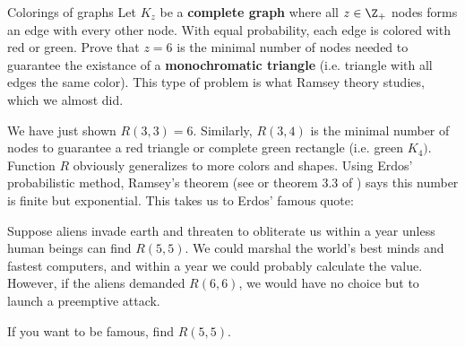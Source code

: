 \documentclass[./some_latex_template.tex]{subfiles}
\begin{document}
\begin{problembox}{Colorings of graphs}{}
Let $K_z$ be a \textbf{complete graph} where all $z \in \Z_+$ nodes forms an edge with every other node. With equal probability, each edge is colored with red or green. Prove that $z=6$ is the minimal number of nodes needed to guarantee the existance of a \textbf{monochromatic triangle} (i.e. triangle with all edges the same color). This type of problem is what Ramsey theory studies, which we almost did. 
\end{problembox}
We have just shown $R(3, 3) = 6$. Similarly, $R(3, 4)$ is the minimal number of nodes to guarantee a red triangle or complete green rectangle (i.e. green $K_4)$. Function $R$ obviously generalizes to more colors and shapes. Using Erdos' probabilistic method, Ramsey's theorem (see \cite{sebv} or theorem 3.3 of \cite{van2001course}) says this number is finite but exponential.  This takes us to Erdos' famous quote:

\begin{displayquote}
Suppose aliens invade earth and threaten to obliterate us within a year unless human beings can find $R(5, 5)$. We could marshal the world's best minds and fastest computers, and within a year we could probably calculate the value. However, if the aliens demanded $R(6, 6)$, we would have no choice but to launch a preemptive attack.
\end{displayquote}
If you want to be famous, find $R(5, 5)$. 


\end{document}
